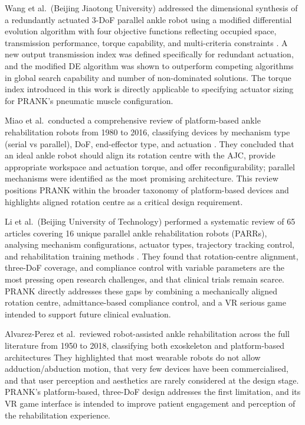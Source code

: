 Wang et al.\ (Beijing Jiaotong University) addressed the dimensional synthesis of a redundantly actuated 3-DoF parallel ankle robot using a modified differential evolution algorithm with four objective functions reflecting occupied space, transmission performance, torque capability, and multi-criteria constraints \cite{Wang2015}.
A new output transmission index was defined specifically for redundant actuation, and the modified DE algorithm was shown to outperform competing algorithms in global search capability and number of non-dominated solutions.
The torque index introduced in this work is directly applicable to specifying actuator sizing for PRANK's pneumatic muscle configuration.

Miao et al.\ conducted a comprehensive review of platform-based ankle rehabilitation robots from 1980 to 2016, classifying devices by mechanism type (serial vs parallel), DoF, end-effector type, and actuation \cite{Miao2018}.
They concluded that an ideal ankle robot should align its rotation centre with the AJC, provide appropriate workspace and actuation torque, and offer reconfigurability; parallel mechanisms were identified as the most promising architecture.
This review positions PRANK within the broader taxonomy of platform-based devices and highlights aligned rotation centre as a critical design requirement.

Li et al.\ (Beijing University of Technology) performed a systematic review of 65 articles covering 16 unique parallel ankle rehabilitation robots (PARRs), analysing mechanism configurations, actuator types, trajectory tracking control, and rehabilitation training methods \cite{Li2020Mechanical}.
They found that rotation-centre alignment, three-DoF coverage, and compliance control with variable parameters are the most pressing open research challenges, and that clinical trials remain scarce.
PRANK directly addresses these gaps by combining a mechanically aligned rotation centre, admittance-based compliance control, and a VR serious game intended to support future clinical evaluation.

Alvarez-Perez et al.\ reviewed robot-assisted ankle rehabilitation across the full literature from 1950 to 2018, classifying both exoskeleton and platform-based architectures %
They highlighted that most wearable robots do not allow adduction/abduction motion, that very few devices have been commercialised, and that user perception and aesthetics are rarely considered at the design stage.
PRANK's platform-based, three-DoF design addresses the first limitation, and its VR game interface is intended to improve patient engagement and perception of the rehabilitation experience.

